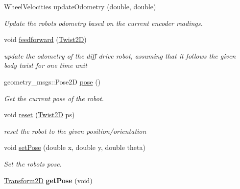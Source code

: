 \begin{DoxyCompactItemize}
\hyperlink{structrigid2d_1_1WheelVelocities}{Wheel\+Velocities} \hyperlink{classrigid2d_1_1DiffDrive_af0ec14baf8f1bd40e1d55226f087ef74}{update\+Odometry} (double, double)
\begin{DoxyCompactList}\small\item\em Update the robot\textquotesingle{}s odometry based on the current encoder readings. \end{DoxyCompactList}\item 
void \hyperlink{classrigid2d_1_1DiffDrive_a87ba3d5ad02cef8285789a2cebe22961}{feedforward} (\hyperlink{classrigid2d_1_1Twist2D}{Twist2D})
\begin{DoxyCompactList}\small\item\em update the odometry of the diff drive robot, assuming that it follows the given body twist for one time unit \end{DoxyCompactList}\item 
geometry\+\_\+msgs\+::\+Pose2D \hyperlink{classrigid2d_1_1DiffDrive_ae4d0c4e53e8558fed8c7711724f585d3}{pose} ()
\begin{DoxyCompactList}\small\item\em Get the current pose of the robot. \end{DoxyCompactList}\item 
void \hyperlink{classrigid2d_1_1DiffDrive_a2554a9bce4ecada65a159498a432d444}{reset} (\hyperlink{classrigid2d_1_1Twist2D}{Twist2D} ps)
\begin{DoxyCompactList}\small\item\em reset the robot to the given position/orientation \end{DoxyCompactList}\item 
void \hyperlink{classrigid2d_1_1DiffDrive_a82198f5be806b6f772a1718f3887f5c9}{set\+Pose} (double x, double y, double theta)
\begin{DoxyCompactList}\small\item\em Set the robot\textquotesingle{}s pose. \end{DoxyCompactList}\item 
\mbox{\label{classrigid2d_1_1DiffDrive_ac9e0ed189932445e27c86839b918b282}} 
\hyperlink{classrigid2d_1_1Transform2D}{Transform2D} {\bfseries get\+Pose} (void)
\end{DoxyCompactItemize}
